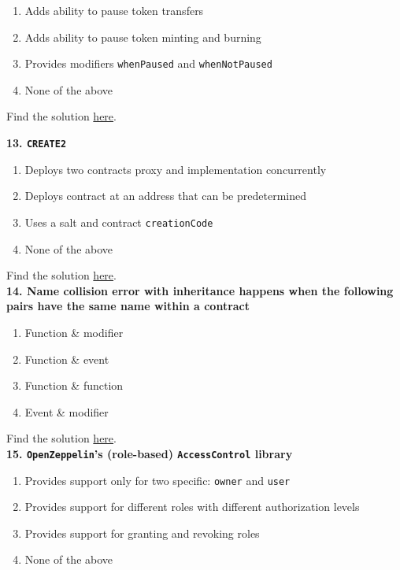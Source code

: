 \begin{enumerate}[label=\Alph*.]
    \item Adds ability to pause token transfers
    \item Adds ability to pause token minting and burning
    \item Provides modifiers \verb|whenPaused| and \verb|whenNotPaused|
    \item None of the above
\end{enumerate}

Find the solution \hyperref[sec:exam3_q12]{here}.\\

\pagebreak

\textbf{13. \texttt{CREATE2}}

\begin{enumerate}[label=\Alph*.]
    \item Deploys two contracts proxy and implementation concurrently
    \item Deploys contract at an address that can be predetermined
    \item Uses a salt and contract \verb|creationCode|
    \item None of the above
\end{enumerate}

Find the solution \hyperref[sec:exam3_q13]{here}.\\

\textbf{14. Name collision error with inheritance happens when the following pairs have the same name within a contract}

\begin{enumerate}[label=\Alph*.]
    \item Function \& modifier
    \item Function \& event
    \item Function \& function
    \item Event \& modifier
\end{enumerate}

Find the solution \hyperref[sec:exam3_q14]{here}.\\

\textbf{15. \texttt{OpenZeppelin}'s (role-based) \texttt{AccessControl} library}

\begin{enumerate}[label=\Alph*.]
    \item Provides support only for two specific: \verb|owner| and \verb|user|
    \item Provides support for different roles with different authorization levels
    \item Provides support for granting and revoking roles
    \item None of the above
\end{enumerate}

